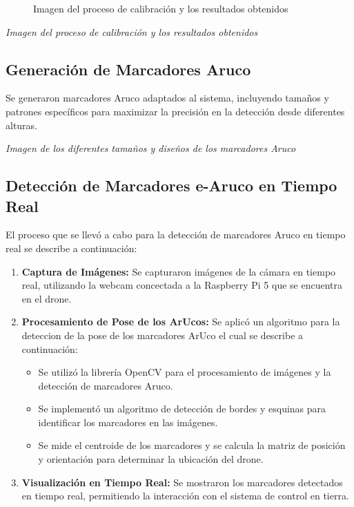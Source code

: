     \begin{center} 
        \figurename{
            \begin{figure}
                \centering
                \caption{Imagen del proceso de calibración y los resultados obtenidos}
            \end{figure}
        }
        
        \textit{Imagen del proceso de calibración y los resultados obtenidos} 
    \end{center}

\subsection{Generación de Marcadores Aruco} 
Se generaron marcadores Aruco adaptados al sistema, incluyendo tamaños y patrones específicos para maximizar la precisión en la detección desde diferentes alturas.
    \begin{center} 
        \textit{Imagen de los diferentes tamaños y diseños de los marcadores Aruco} 
    \end{center}

\subsection{Detección de Marcadores e-Aruco en Tiempo Real} 
El proceso que se llevó a cabo para la detección de marcadores Aruco en tiempo real se describe a continuación:

    \begin{enumerate} 
        \item \textbf{Captura de Imágenes:} Se capturaron imágenes de la cámara en tiempo real, utilizando la webcam concectada a la Raspberry Pi 5 que se encuentra en el drone. 
        \item \textbf{Procesamiento de Pose de los ArUcos:} Se aplicó un algoritmo para la deteccion de la pose de los marcadores ArUco el cual se describe a continuación: 
            \begin{itemize} 
                \item Se utilizó la librería OpenCV para el procesamiento de imágenes y la detección de marcadores Aruco. 
                \item Se implementó un algoritmo de detección de bordes y esquinas para identificar los marcadores en las imágenes. 
                \item Se mide el centroide de los marcadores y se calcula la matriz de posición y orientación para determinar la ubicación del drone.
             \end{itemize}
        
        \item \textbf{Visualización en Tiempo Real:} Se mostraron los marcadores detectados en tiempo real, permitiendo la interacción con el sistema de control en tierra.
    \end{enumerate}

